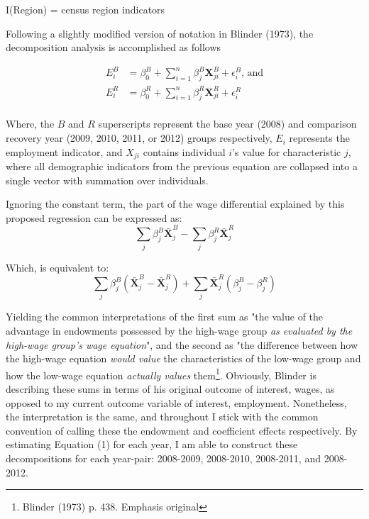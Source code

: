 \documentclass[11pt]{article}
\theoremstyle{definition}
\begin{document}
\par
\hspace{15mm}I(Region) = census region indicators 

\vspace{3mm}  
\par
Following a slightly modified version of notation in Blinder (1973), the decomposition analysis is accomplished as follows

\begin{equation*}
\begin{split}
E^{B}_i &=\beta^{B}_0 + \sum_{i=1}^n \beta^{B}_j \boldsymbol{X}^{B}_{ji} + \epsilon^{B}_i\text{, and} \\
E^{R}_i &=\beta^{R}_0 + \sum_{i=1}^n \beta^{R}_j \boldsymbol{X}^{R}_{ji} + \epsilon^{R}_i \\
\end{split}
\end{equation*}

Where, the $B$ and $R$ superscripts represent the base year (2008) and comparison recovery year (2009, 2010, 2011, or 2012) groups respectively, $E_i$ represents the employment indicator, and \textbf{$X_{ji}$} contains individual $i$'s value for characteristic $j$, where all demographic indicators from the previous equation are collapsed into a single vector with summation over individuals.  

Ignoring the constant term, the part of the wage differential explained by this proposed regression can be expressed as:
\begin{equation*}
\sum_j \beta^B_j \bar{\boldsymbol{X}}^B_j - \sum_j \beta^R_j \bar{\boldsymbol{X}}^R_j
\end{equation*}

Which, is equivalent to:
\begin{equation*}
\sum_j \beta^B_j (\bar{\boldsymbol{X}}^B_j- \bar{\boldsymbol{X}}^R_j) + \sum_j \bar{\boldsymbol{X}}^R_j (\beta^B_j - \beta^R_j )
\end{equation*}

Yielding the common interpretations of the first sum as "the value of the advantage in endowments possessed by the high-wage group \textit{as evaluated by the high-wage group's wage equation}", and the second as "the difference between how the high-wage equation \textit{would value} the characteristics of the low-wage group and how the low-wage equation \textit{actually values} them\footnote{Blinder (1973) p. 438.  Emphasis original}.  Obviously, Blinder is describing these sums in terms of his original outcome of interest, wages, as opposed to my current outcome variable of interest, employment.  Nonetheless, the interpretation is the same, and throughout I stick with the common convention of calling these the endowment and coefficient effects respectively.  By estimating Equation (1) for each year, I am able to construct these decompositions for each year-pair: 2008-2009, 2008-2010, 2008-2011, and 2008-2012.   
\end{document}

